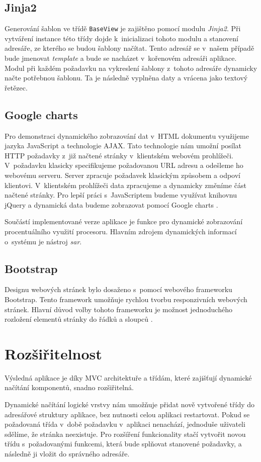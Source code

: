     \subsection{Jinja2}
    Generování šablon ve třídě \verb|BaseView| je zajištěno pomocí modulu \emph{Jinja2}. Při vytváření instance této třídy dojde k~inicializaci tohoto modulu a stanovení adresáře, ze kterého se budou šablony načítat. Tento adresář se v~našem případě bude jmenovat \emph{template} a bude se nacházet v~kořenovém adresáři aplikace. Modul při každém požadavku na vykreslení šablony z~tohoto adresáře dynamicky načte potřebnou šablonu. Ta je následně vyplněna daty a vrácena jako textový řetězec.
    \subsection{Google charts}
    Pro demonstraci dynamického zobrazování dat v~HTML dokumentu využijeme jazyka JavaScript a technologie AJAX. Tato technologie nám umožní posílat HTTP požadavky z~již načtené stránky v~klientském webovém prohlížeči. V~požadavku klasicky specifikujeme požadovanou URL adresu a odešleme ho webovému serveru. Server zpracuje požadavek klasickým způsobem a odpoví klientovi. V~klientském prohlížeči data zpracujeme a dynamicky změníme část načtené stránky. Pro lepší práci s~JavaScriptem budeme využívat knihovnu jQuery \cite{jquery} a dynamická data budeme zobrazovat pomocí Google charts \cite{google}.

    Součástí implementované verze aplikace je funkce pro dynamické zobrazování procentuálního využití procesoru. Hlavním zdrojem dynamických informací o~systému je nástroj \emph{sar}.
    \subsection{Bootstrap}
    Designu webových stránek bylo dosaženo s~pomocí webového frameworku Bootstrap. Tento framework umožňuje rychlou tvorbu responzivních webových stránek. Hlavní důvod volby tohoto frameworku je možnost jednoduchého rozložení elementů stránky do řádků a sloupců \cite{bootstrap}.


\section{Rozšiřitelnost}
Výsledná aplikace je díky MVC architektuře a třídám, které zajišťují dynamické načítání komponentů, snadno rozšiřitelná.

Dynamické načítání logické vrstvy nám umožňuje přidat nově vytvořené třídy do adresářové struktury aplikace, bez nutnosti celou aplikaci restartovat. Pokud se požadovaná třída v~době požadavku v~aplikaci nenachází, jednoduše uživateli sdělíme, že stránka neexistuje. Pro rozšíření funkcionality stačí vytvořit novou třídu s~požadovanými funkcemi, která bude splňovat stanovené požadavky, a následně ji vložit do správného adresáře.

